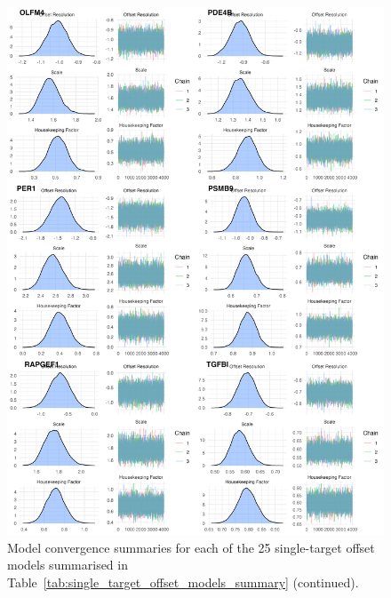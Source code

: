 \documentclass[../thesis.tex]{subfiles}
\begin{document}
\begin{figure}
    \centering
    \includegraphics[width=\textwidth]{figures/chapter2/model_summaries_4.png}
    \caption{Model convergence summaries for each of the 25 single-target offset models summarised in Table~\ref{tab:single_target_offset_models_summary} (continued).}
    \label{fig:convergence_4}
\end{figure}

\dobib %
 
\end{document}
